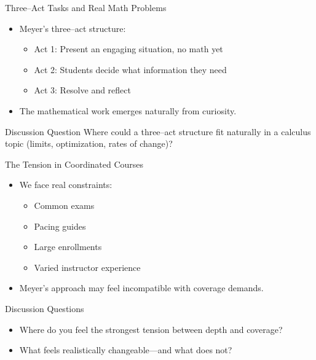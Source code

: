 \documentclass{beamer}
\begin{document}
\begin{frame}{Three–Act Tasks and Real Math Problems}
  \begin{itemize}
    \item Meyer’s three–act structure:
    \begin{itemize}
      \item Act 1: Present an engaging situation, no math yet
      \item Act 2: Students decide what information they need
      \item Act 3: Resolve and reflect
    \end{itemize}
    \item The mathematical work emerges naturally from curiosity.
  \end{itemize}
  
  \begin{block}{Discussion Question}
    Where could a three–act structure fit naturally in a calculus topic (limits, optimization, rates of change)?
  \end{block}
\end{frame}


\begin{frame}{The Tension in Coordinated Courses}
  \begin{itemize}
    \item We face real constraints:
    \begin{itemize}
      \item Common exams
      \item Pacing guides
      \item Large enrollments
      \item Varied instructor experience
    \end{itemize}
    \item Meyer’s approach may feel incompatible with coverage demands.
  \end{itemize}
  
  \begin{block}{Discussion Questions}
    \begin{itemize}
      \item Where do you feel the strongest tension between depth and coverage?
      \item What feels realistically changeable—and what does not?
    \end{itemize}
  \end{block}
\end{frame}
\end{document}
